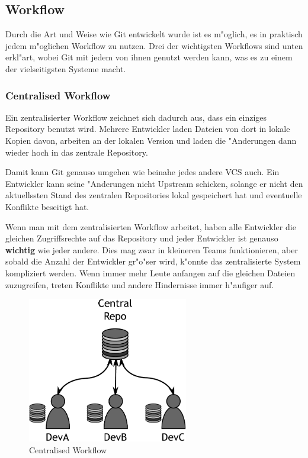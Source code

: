 \subsection{Workflow}

Durch die Art und Weise wie Git entwickelt wurde ist es m"oglich, es in praktisch jedem m"oglichen Workflow zu nutzen. Drei der wichtigsten Workflows sind unten
erkl"art, wobei Git mit jedem von ihnen genutzt werden kann, was es zu einem der vielseitigsten Systeme macht.

\subsubsection{Centralised Workflow}

Ein zentralisierter Workflow zeichnet sich dadurch aus, dass ein einziges Repository benutzt wird. Mehrere Entwickler laden Dateien von dort in lokale Kopien davon,
arbeiten an der lokalen Version und laden die "Anderungen dann wieder hoch in das zentrale Repository.

Damit kann Git genauso umgehen wie beinahe jedes andere VCS auch. Ein Entwickler kann seine "Anderungen nicht Upstream schicken, solange er nicht den aktuellssten
Stand des zentralen Repositories lokal gespeichert hat und eventuelle Konflikte beseitigt hat.

Wenn man mit dem zentralisierten Workflow arbeitet, haben alle Entwickler die gleichen Zugriffsrechte auf das Repository und jeder Entwickler ist genauso
\textbf{wichtig} wie jeder andere. Dies mag zwar in kleineren Teams funktionieren, aber sobald die Anzahl der Entwickler gr"o"ser wird, k"onnte das zentralisierte
System kompliziert werden. Wenn immer mehr Leute anfangen auf die gleichen Dateien zuzugreifen, treten Konflikte und andere Hindernisse immer h"aufiger auf.

\begin{figure}[bt]
	\centering
	\includegraphics[width=7cm]{images/f-w1-d1.pdf}
	\caption{Centralised Workflow}
\end{figure}


